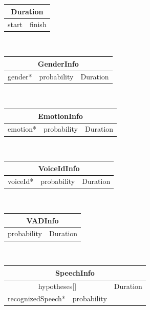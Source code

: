 \begin{figure}[]
	\centering
	\begin{tabular}{| l | l |}
		\hline
		\multicolumn{2}{|c|}{\textbf{Duration}} \\\hline
		start & finish \\\hline
	\end{tabular}\\\vspace{0.3cm}
	
	\begin{tabular}{| l | l | l |}
		\hline
		
		\multicolumn{3}{|c|}{\textbf{GenderInfo}} \\ \hline
		gender* & probability & Duration \\\hline
	\end{tabular}\\\vspace{0.3cm}
	
	\begin{tabular}{| l | l | l |}
		\hline
		
		\multicolumn{3}{|c|}{\textbf{EmotionInfo}} \\ \hline
		emotion* & probability & Duration  \\\hline
	\end{tabular}\\\vspace{0.3cm}
	
	\begin{tabular}{| l | l | l |}
		\hline
		
		\multicolumn{3}{|c|}{\textbf{VoiceIdInfo}} \\ \hline
		voiceId* & probability & Duration  \\\hline
	\end{tabular}\\\vspace{0.3cm}
	
	\begin{tabular}{| l | l |}
		\hline
		
		\multicolumn{2}{|c|}{\textbf{VADInfo}} \\ \hline
		probability & Duration  \\\hline
	\end{tabular}\\\vspace{0.3cm}
	
	\begin{tabular}{| l | l | l |}
		\hline
		
		\multicolumn{3}{|c|}{\textbf{SpeechInfo}} \\ \hline
		\multicolumn{2}{|c|}{hypotheses[]} & Duration  \\\cline{1-2}
		recognizedSpeech* & probability & \\\hline
	\end{tabular}\\\vspace{0.3cm}
	

\end{figure}
